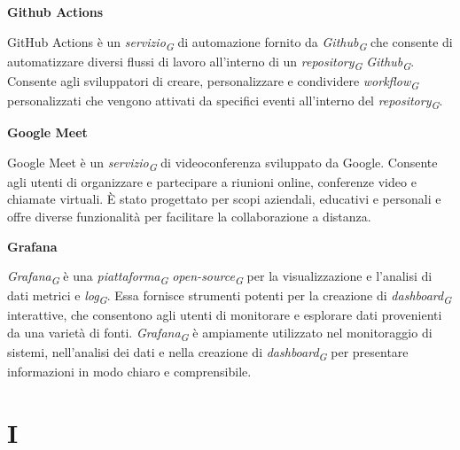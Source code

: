 \documentclass{article}
\begin{document}
\vspace{0.4cm}

\textbf{Github Actions}

\vspace{0.1cm}

GitHub Actions è un \textit{servizio}\textsubscript{\textit{G}} di automazione fornito da \textit{Github}\textsubscript{\textit{G}} che consente di automatizzare diversi flussi di lavoro all'interno di un \textit{repository}\textsubscript{\textit{G}} \textit{Github}\textsubscript{\textit{G}}. Consente agli sviluppatori di creare, personalizzare e condividere \textit{workflow}\textsubscript{\textit{G}} personalizzati che vengono attivati da specifici eventi all'interno del \textit{repository}\textsubscript{\textit{G}}.

\vspace{0.4cm}

\textbf{Google Meet}

\vspace{0.1cm}

Google Meet è un \textit{servizio}\textsubscript{\textit{G}} di videoconferenza sviluppato da Google. Consente agli utenti di organizzare e partecipare a riunioni online, conferenze video e chiamate virtuali. È stato progettato per scopi aziendali, educativi e personali e offre diverse funzionalità per facilitare la collaborazione a distanza. 

\vspace{0.4cm}

\textbf{Grafana}

\vspace{0.1cm}

\textit{Grafana}\textsubscript{\textit{G}} è una \textit{piattaforma}\textsubscript{\textit{G}} \textit{open-source}\textsubscript{\textit{G}} per la visualizzazione e l'analisi di dati metrici e \textit{log}\textsubscript{\textit{G}}. Essa fornisce strumenti potenti per la creazione di \textit{dashboard}\textsubscript{\textit{G}} interattive, che consentono agli utenti di monitorare e esplorare dati provenienti da una varietà di fonti. \textit{Grafana}\textsubscript{\textit{G}} è ampiamente utilizzato nel monitoraggio di sistemi, nell'analisi dei dati e nella creazione di \textit{dashboard}\textsubscript{\textit{G}} per presentare informazioni in modo chiaro e comprensibile.

\pagebreak
\section*{I}
{}
\end{document}
